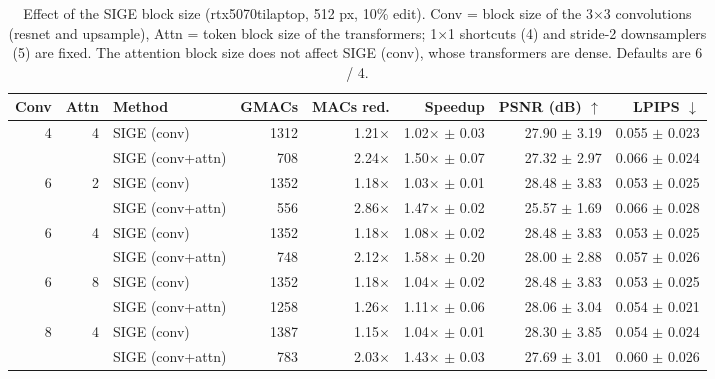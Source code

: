 \begin{table}[t]
\centering
\small
\caption{Effect of the SIGE block size (rtx5070tilaptop, 512 px, 10\% edit). Conv = block size of the 3$\times$3 convolutions (resnet and upsample), Attn = token block size of the transformers; 1$\times$1 shortcuts (4) and stride-2 downsamplers (5) are fixed. The attention block size does not affect SIGE (conv), whose transformers are dense. Defaults are 6 / 4.}
\label{tab:block_size_rtx5070tilaptop}
\begin{tabular}{rrlrrrrr}
\toprule
Conv & Attn & Method & GMACs & MACs red. & Speedup & PSNR (dB) $\uparrow$ & LPIPS $\downarrow$ \\
\midrule
4 & 4 & SIGE (conv) & 1312 & 1.21$\times$ & 1.02$\times$ $\pm$ 0.03 & 27.90 $\pm$ 3.19 & 0.055 $\pm$ 0.023 \\
 &  & SIGE (conv+attn) & 708 & 2.24$\times$ & 1.50$\times$ $\pm$ 0.07 & 27.32 $\pm$ 2.97 & 0.066 $\pm$ 0.024 \\
\midrule
6 & 2 & SIGE (conv) & 1352 & 1.18$\times$ & 1.03$\times$ $\pm$ 0.01 & 28.48 $\pm$ 3.83 & 0.053 $\pm$ 0.025 \\
 &  & SIGE (conv+attn) & 556 & 2.86$\times$ & 1.47$\times$ $\pm$ 0.02 & 25.57 $\pm$ 1.69 & 0.066 $\pm$ 0.028 \\
\midrule
6 & 4 & SIGE (conv) & 1352 & 1.18$\times$ & 1.08$\times$ $\pm$ 0.02 & 28.48 $\pm$ 3.83 & 0.053 $\pm$ 0.025 \\
 &  & SIGE (conv+attn) & 748 & 2.12$\times$ & 1.58$\times$ $\pm$ 0.20 & 28.00 $\pm$ 2.88 & 0.057 $\pm$ 0.026 \\
\midrule
6 & 8 & SIGE (conv) & 1352 & 1.18$\times$ & 1.04$\times$ $\pm$ 0.02 & 28.48 $\pm$ 3.83 & 0.053 $\pm$ 0.025 \\
 &  & SIGE (conv+attn) & 1258 & 1.26$\times$ & 1.11$\times$ $\pm$ 0.06 & 28.06 $\pm$ 3.04 & 0.054 $\pm$ 0.021 \\
\midrule
8 & 4 & SIGE (conv) & 1387 & 1.15$\times$ & 1.04$\times$ $\pm$ 0.01 & 28.30 $\pm$ 3.85 & 0.054 $\pm$ 0.024 \\
 &  & SIGE (conv+attn) & 783 & 2.03$\times$ & 1.43$\times$ $\pm$ 0.03 & 27.69 $\pm$ 3.01 & 0.060 $\pm$ 0.026 \\
\bottomrule
\end{tabular}
\end{table}
